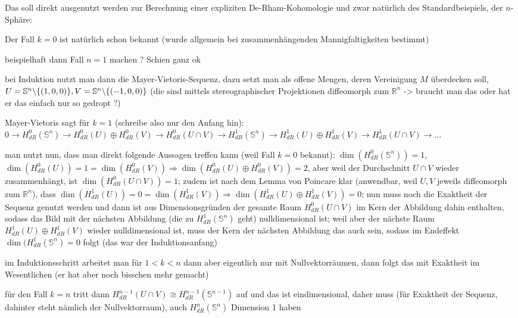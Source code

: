 \documentclass[../H_Analysis_main.tex]{subfiles}
\begin{document}
Das soll direkt ausgenutzt werden zur Berechnung einer expliziten De-Rham-Kohomologie und zwar natürlich des Standardbeispiels, der $n$-Sphäre:
\begin{bsp}
Der Fall $k = 0$ ist natürlich schon bekannt  (wurde allgemein bei zusammenhängenden Mannigfaltigkeiten bestimmt)


beispielhaft dann Fall $n = 1$ machen ? Schien ganz ok

bei Induktion nutzt man dann die Mayer-Vietoris-Sequenz, dazu setzt man als offene Mengen, deren Vereinigung $M$ überdecken soll, $U = \mathbb{S}^n \backslash \qty{(1, 0, 0)}, V = \mathbb{S}^n \backslash \qty{(-1, 0, 0)}$ (die sind mittels stereographischer Projektionen diffeomorph zum $\mathbb{R}^n$ -> braucht man das oder hat er das einfach nur so gedropt ?)

Mayer-Vietoris sagt für $k = 1$ (schreibe also nur den Anfang hin): $0 \rightarrow H_{dR}^0(\mathbb{S}^n) \rightarrow H_{dR}^0(U) \oplus H_{dR}^0(V) \rightarrow H_{dR}^0(U \cap V) \rightarrow H_{dR}^1(\mathbb{S}^n) \rightarrow H_{dR}^1(U) \oplus H_{dR}^1(V) \rightarrow H_{dR}^1(U \cap V) \rightarrow \dots$

man nutzt nun, dass man direkt folgende Aussagen treffen kann (weil Fall $k = 0$ bekannt): $\dim(H_{dR}^0(\mathbb{S}^n)) = 1$, $\dim(H_{dR}^0(U)) = 1 = \dim(H_{dR}^0(V)) \Rightarrow \dim(H_{dR}^0(U) \oplus H_{dR}^0(V)) = 2$, aber weil der Durchschnitt $U \cap V$ wieder zusammenhängt, ist $\dim(H_{dR}^0(U \cap V)) = 1$; zudem ist nach dem Lemma von Poincare klar (anwendbar, weil $U, V$ jeweils diffeomorph zum $\mathbb{R}^n$), dass $\dim(H_{dR}^1(U)) = 0 = \dim(H_{dR}^1(V)) \Rightarrow \dim(H_{dR}^1(U) \oplus H_{dR}^1(V)) = 0$; nun muss noch die Exaktheit der Sequenz genutzt werden und dann ist aus Dimensionsgründen der gesamte Raum $H_{dR}^0(U \cap V)$ im Kern der Abbildung dahin enthalten, sodass das Bild mit der nächsten Abbildung (die zu $H_{dR}^1(\mathbb{S}^n)$ geht) nulldimensional ist; weil aber der nächste Raum $H_{dR}^1(U) \oplus H_{dR}^1(V)$ wieder nulldimensional ist, muss der Kern der nächsten Abbildung das auch sein, sodass im Endeffekt $\dim(H_{dR}^1(\mathbb{S}^n) = 0$ folgt (das war der Induktionsanfang)

im Induktionsschritt arbeitet man für $1 < k < n$ dann aber eigentlich nur mit Nullvektorräumen, dann folgt das mit Exaktheit im Wesentlichen (er hat aber noch bisschen mehr gemacht)


für den Fall $k = n$ tritt dann $H_{dR}^{n - 1}(U \cap V) \cong H_{dR}^{n - 1}(\mathbb{S}^{n - 1})$ auf und das ist eindimensional, daher muss  (für Exaktheit der Sequenz, dahinter steht nämlich der Nullvektorraum), auch $H_{dR}^n(\mathbb{S}^n)$ Dimension 1 haben



\end{bsp}
\end{document}
